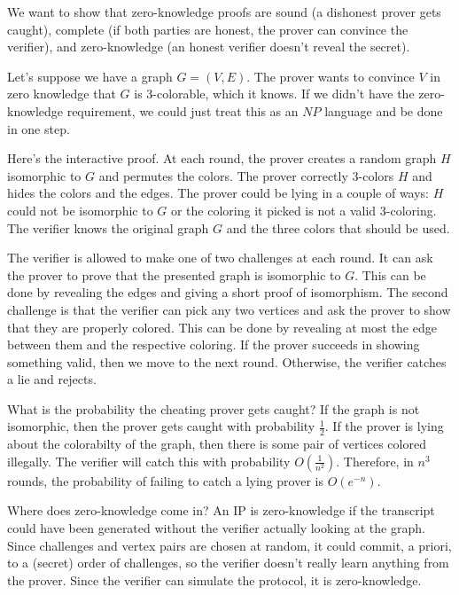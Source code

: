 We want to show that zero-knowledge proofs are sound (a dishonest prover gets caught), complete (if both parties are honest, the prover can convince the verifier), and zero-knowledge (an honest verifier doesn't reveal the secret).  

Let's suppose we have a graph $G=(V,E)$.  The prover wants to convince $V$ in zero knowledge that $G$ is 3-colorable, which it knows.  If we didn't have the zero-knowledge requirement, we could just treat this as an $NP$ language and be done in one step.

Here's the interactive proof.  At each round, the prover creates a random graph $H$ isomorphic to $G$ and permutes the colors.  The prover correctly 3-colors $H$ and hides the colors and the edges.  The prover could be lying in a couple of ways: $H$ could not be isomorphic to $G$ or the coloring it picked is not a valid 3-coloring.  The verifier knows the original graph $G$ and the three colors that should be used.

The verifier is allowed to make one of two challenges at each round.  It can ask the prover to prove that the presented graph is isomorphic to $G$.  This can be done by revealing the edges and giving a short proof of isomorphism.  The second challenge is that the verifier can pick any two vertices and ask the prover to show that they are properly colored.  This can be done by revealing at most the edge between them and the respective coloring.  If the prover succeeds in showing something valid, then we move to the next round.  Otherwise, the verifier catches a lie and rejects.

What is the probability the cheating prover gets caught?  If the graph is not isomorphic, then the prover gets caught with probability $\frac{1}{2}$.  If the prover is lying about the colorabilty of the graph, then there is some pair of vertices colored illegally.  The verifier will catch this with probability $O(\frac{1}{n^2})$.  Therefore, in $n^3$ rounds, the probability of failing to catch a lying prover is $O(e^{-n})$.

Where does zero-knowledge come in?  An IP is zero-knowledge if the transcript could have been generated without the verifier actually looking at the graph.  Since challenges and vertex pairs are chosen at random, it could commit, a priori, to a (secret) order of challenges, so the verifier doesn't really learn anything from the prover.  Since the verifier can simulate the protocol, it is zero-knowledge.


